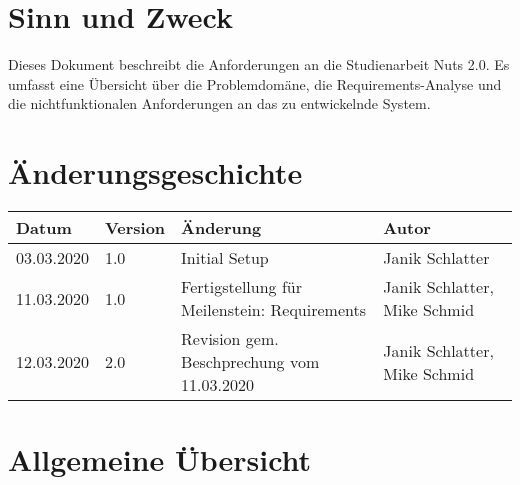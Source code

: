 \documentclass[
	ngerman,
	toc=listof, %
	toc=bibliography, %
	footnotes=multiple, %
	parskip=half, %
	numbers=noendperiod %
]{scrartcl}
\newcommand{\vorlagenOrdner}{../../99_Vorlagen} %
\begin{document}
\thispagestyle{plain}

\cleardoublepage


\section{Sinn und Zweck}
Dieses Dokument beschreibt die Anforderungen an die Studienarbeit Nuts 2.0.
Es umfasst eine Übersicht über die Problemdomäne, die Requirements-Analyse und die nichtfunktionalen Anforderungen an das zu entwickelnde System.

\section*{Änderungsgeschichte}
\begin{tabularx}{\textwidth}{llXl}
	\toprule
	Datum & Version & Änderung & Autor \\
	\midrule
	03.03.2020 & 1.0 & Initial Setup & Janik Schlatter \\
	11.03.2020 & 1.0 & Fertigstellung für Meilenstein: Requirements & Janik Schlatter, Mike Schmid \\
	12.03.2020 & 2.0 & Revision gem. Beschprechung vom 11.03.2020 & Janik Schlatter, Mike Schmid \\
	\bottomrule
\end{tabularx}
\cleardoublepage

{}
\tableofcontents
\cleardoublepage

\let\stdsection\section
\renewcommand\section{\clearpage\stdsection}

\section{Allgemeine Übersicht}
\end{document}
